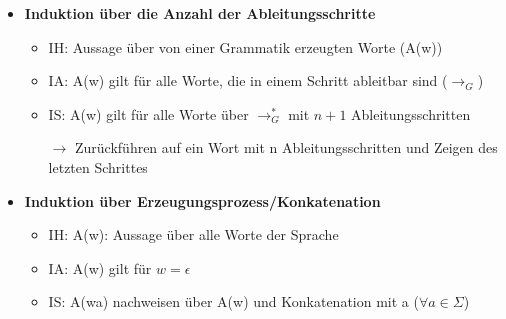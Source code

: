 \begin{itemize}
\begin{itemize}
	\item \textbf{Induktion über die Anzahl der Ableitungsschritte}
		\begin{itemize}
		\item IH: Aussage über von einer Grammatik erzeugten Worte (A(w))
		\item IA: A(w) gilt für alle Worte, die in einem Schritt ableitbar sind ($\rightarrow_G$)
		\item IS: A(w) gilt für alle Worte über $\rightarrow^*_G$ mit $n+1$ Ableitungsschritten
		\item[$\rightarrow$] Zurückführen auf ein Wort mit n Ableitungsschritten und Zeigen des letzten Schrittes
		\end{itemize}
		
	\item \textbf{Induktion über Erzeugungsprozess/Konkatenation}
		\begin{itemize}
		\item IH: A(w): Aussage über alle Worte der Sprache
		\item IA: A(w) gilt für $w = \epsilon$
		\item IS: A(wa) nachweisen über A(w) und Konkatenation mit a ($\forall a \in \Sigma$)
		\end{itemize}
	
	\end{itemize}
	
\pagebreak	
	

\end{itemize}
